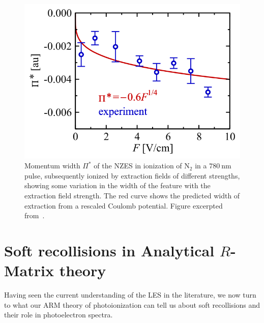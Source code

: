 \begin{figure}[t]
  \centering
  \includegraphics[scale=1.15]{6-LES/Figures/figure6O.png}
  \caption[
  Measured momentum width of the NZES, compared with predictions from extraction-field theory, as observed by E. Diesen et al.
  ]{
  Momentum width $\Pi^*$ of the NZES in ionization of $\mathrm{N_2}$ in a $\SI{780}{\nano\meter}$ pulse, subsequently ionized by extraction fields of different strengths, showing some variation in the width of the feature with the extraction field strength. The red curve shows the predicted width of extraction from a rescaled Coulomb potential.
  Figure excerpted from~.
  }
\label{f6-diesen-scaling-original-figure}
\end{figure}




\section[Soft recollisions in Analytical R-Matrix theory]{Soft recollisions in Analytical $R$-Matrix theory}
\label{sec:ARM-soft-recollisions}

Having seen the current understanding of the LES in the literature, we now turn to what our ARM theory of photoionization can tell us about soft recollisions and their role in photoelectron spectra. 

